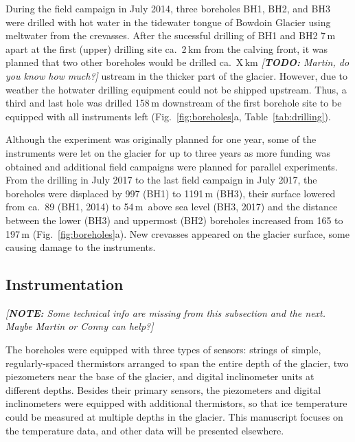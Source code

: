 \documentclass[utf8]{article}
\newcommand{\note}[1]{\textcolor{c0}{\emph{[\textbf{NOTE:} #1]}}}
\newcommand{\todo}[1]{\textcolor{c3}{\emph{[\textbf{TODO:} #1]}}}
\begin{document}
    During the field campaign in July 2014, three boreholes BH1, BH2, and BH3
    were drilled with hot water in the tidewater tongue of Bowdoin Glacier
    using meltwater from the crevasses. After the sucessful drilling of BH1
    and BH2 7\,m apart at the first (upper) drilling site ca.~2\,km from the
    calving front, it was planned that two other boreholes would be drilled
    ca.~X\,km \todo{Martin, do you know how much?}
    ustream in the thicker part of the glacier. However, due to weather the
    hotwater drilling equipment could not be shipped upstream. Thus, a third
    and last hole was drilled 158\,m downstream of the first borehole site
    to be equipped with all instruments left (Fig.~\ref{fig:boreholes}a,
    Table~\ref{tab:drilling}).

    Although the experiment was originally planned for one year, some of the
    instruments were let on the glacier for up to three years as more funding
    was obtained and additional field campaigns were planned for parallel
    experiments. From the drilling in July 2017 to the last field campaign in
    July 2017, the boreholes were displaced by 997 (BH1) to 1191\,m (BH3),
    their surface lowered from ca.~89 (BH1, 2014) to 54\,m~above sea level
    (BH3, 2017) and
    the distance between the lower (BH3) and uppermost (BH2) boreholes
    increased from 165 to 197\,m (Fig.~\ref{fig:boreholes}a). New crevasses
    appeared on the glacier surface, some causing damage to the instruments.


\subsection{Instrumentation}

    \note{Some technical info are missing from this subsection and the next.
          Maybe Martin or Conny can help?}

    The boreholes were equipped with three types of sensors: strings of simple,
    regularly-spaced thermistors arranged to span the entire depth of the
    glacier, two piezometers near the base of the glacier, and digital
    inclinometer units at different depths. Besides their primary sensors, the
    piezometers and digital inclinometers were equipped with additional
    thermistors, so that ice temperature could be measured at multiple depths
    in the glacier. This manuscript focuses on the temperature data, and other
    data will be presented elsewhere.
\end{document}
